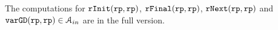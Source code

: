 The computations for $\mathtt{rInit}(\mathtt{rp}, \mathtt{rp})$,
$\mathtt{rFinal}(\mathtt{rp}, \mathtt{rp})$, $\mathtt{rNext}(\mathtt{rp}, \mathtt{rp})$ and $\mathtt{varGD}(\mathtt{rp}, \mathtt{rp}) \in \mathcal{A}_{in}$
are in the full version.

